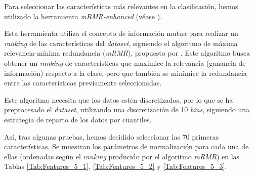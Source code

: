 \documentclass[12pt]{article}
\begin{document}
\bigskip
Para seleccionar las características más relevantes en la clasificación, hemos utilizado la herramienta \textit{mRMR-enhanced} (véase \cite{mRMR-enhanced}).

Esta herramienta utiliza el concepto de información mutua para realizar un \textit{ranking} de las características del \textit{dataset},
siguiendo el algoritmo de máxima relevancia-mínima redundancia (\textit{mRMR}), propuesto por \cite{peng2005mrmr}. Este algoritmo busca obtener un \textit{ranking}
de características que maximice la relevancia (ganancia de información) respecto a la clase, pero que también se minimice
la redundancia entre las características previamente seleccionadas.

\bigskip
Este algoritmo necesita que los datos estén discretizados, por lo que se ha preprocesado el \textit{dataset}, utilizando
una discretización de 10 \textit{bins}, siguiendo una estrategia de reparto de los datos por cuantiles. 

\bigskip
Así, tras algunas pruebas, hemos decidido seleccionar las 70 primeras características. Se muestran los parámetros de normalización
para cada una de ellas (ordenadas según el \textit{ranking} producido por el algoritmo \textit{mRMR}) en las Tablas \ref{Tab:Features_5_1}, \ref{Tab:Features_5_2} y \ref{Tab:Features_5_3}.
\end{document}

